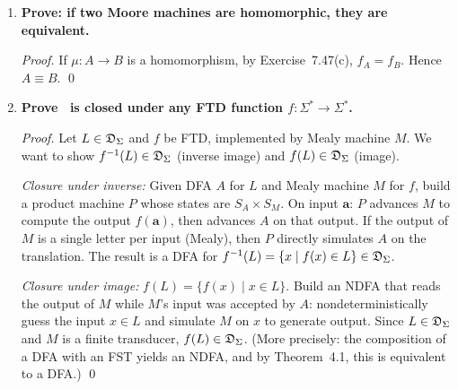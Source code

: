 \begin{enumerate}[{7.}1.]
\item \textbf{Prove: if two Moore machines are homomorphic, they are equivalent.}

\begin{proof}
If $\mu:A\to B$ is a homomorphism, by Exercise~7.47(c), $f_A=f_B$.  Hence $A\equiv B$. \qed
\end{proof}

\item \textbf{Prove \DSIG\ is closed under any FTD function $f:\Sigma^*\to\Sigma^*$.}

\begin{proof}
Let $L\in\mathfrak{D}_\Sigma$ and $f$ be FTD, implemented by Mealy machine $M$.  We want to show $f^{-1}(L)\in\mathfrak{D}_\Sigma$ (inverse image) and $f(L)\in\mathfrak{D}_\Sigma$ (image).

\emph{Closure under inverse:}  Given DFA $A$ for $L$ and Mealy machine $M$ for $f$, build a product machine $P$ whose states are $S_A\times S_M$.  On input $\pmb{a}$: $P$ advances $M$ to compute the output $f(\pmb{a})$, then advances $A$ on that output.  If the output of $M$ is a single letter per input (Mealy), then $P$ directly simulates $A$ on the translation.  The result is a DFA for $f^{-1}(L)=\{x\mid f(x)\in L\}\in\mathfrak{D}_\Sigma$.

\emph{Closure under image:}  $f(L)=\{f(x)\mid x\in L\}$.  Build an NDFA that reads the output of $M$ while $M$'s input was accepted by $A$: nondeterministically guess the input $x\in L$ and simulate $M$ on $x$ to generate output.  Since $L\in\mathfrak{D}_\Sigma$ and $M$ is a finite transducer, $f(L)\in\mathfrak{D}_\Sigma$.  (More precisely: the composition of a DFA with an FST yields an NDFA, and by Theorem~4.1, this is equivalent to a DFA.) \qed
\end{proof}

\end{enumerate}
